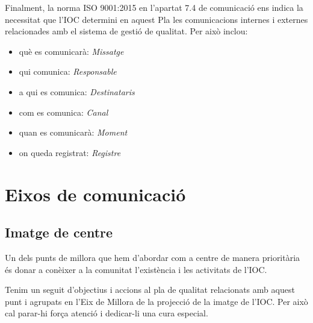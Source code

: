 \documentclass[fontsize=10pt,%
paper=a4,%
DIV=14,%
pagesize=auto,%
parskip=half,
captions=tableheading,%
numbers=noenddot,%
toc=graduated%
]{scrartcl}
\begin{document}
Finalment, la norma ISO 9001:2015 en l'apartat 7.4 de comunicació ens indica la necessitat que l'IOC determini en aquest Pla les comunicacions internes i externes relacionades amb el sistema de gestió de qualitat. Per això inclou:

\begin{itemize}
\item  què es comunicarà: \textit{Missatge}
\item  qui comunica: \textit{Responsable}
\item  a qui es comunica: \textit{Destinataris}
\item  com es comunica: \textit{Canal}
\item  quan es comunicarà: \textit{Moment}
\item  on queda registrat: \textit{Registre}
\end{itemize}

\section{Eixos de comunicació}\label{sec:eixos}

\subsection{Imatge de centre}

Un dels punts de millora que hem d'abordar com a centre de manera prioritària és
donar a conèixer a la comunitat l'existència i les activitats de l'IOC.

Tenim un seguit d'objectius i accions al pla de qualitat relacionats amb aquest punt i agrupats en l'Eix de Millora de la projecció de la imatge de l'IOC. Per això cal parar-hi força atenció i dedicar-li una cura especial.
\end{document}
